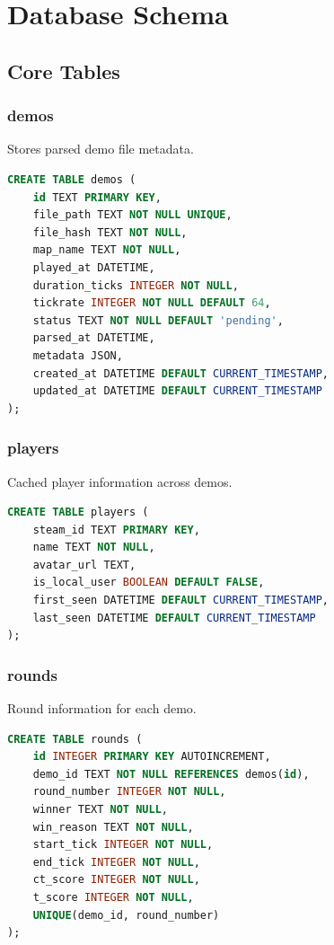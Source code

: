 \chapter{Database Schema}
\label{app:schema}

\section{Core Tables}

\subsection{demos}

Stores parsed demo file metadata.

\begin{lstlisting}[language=SQL]
CREATE TABLE demos (
    id TEXT PRIMARY KEY,
    file_path TEXT NOT NULL UNIQUE,
    file_hash TEXT NOT NULL,
    map_name TEXT NOT NULL,
    played_at DATETIME,
    duration_ticks INTEGER NOT NULL,
    tickrate INTEGER NOT NULL DEFAULT 64,
    status TEXT NOT NULL DEFAULT 'pending',
    parsed_at DATETIME,
    metadata JSON,
    created_at DATETIME DEFAULT CURRENT_TIMESTAMP,
    updated_at DATETIME DEFAULT CURRENT_TIMESTAMP
);
\end{lstlisting}

\subsection{players}

Cached player information across demos.

\begin{lstlisting}[language=SQL]
CREATE TABLE players (
    steam_id TEXT PRIMARY KEY,
    name TEXT NOT NULL,
    avatar_url TEXT,
    is_local_user BOOLEAN DEFAULT FALSE,
    first_seen DATETIME DEFAULT CURRENT_TIMESTAMP,
    last_seen DATETIME DEFAULT CURRENT_TIMESTAMP
);
\end{lstlisting}

\subsection{rounds}

Round information for each demo.

\begin{lstlisting}[language=SQL]
CREATE TABLE rounds (
    id INTEGER PRIMARY KEY AUTOINCREMENT,
    demo_id TEXT NOT NULL REFERENCES demos(id),
    round_number INTEGER NOT NULL,
    winner TEXT NOT NULL,
    win_reason TEXT NOT NULL,
    start_tick INTEGER NOT NULL,
    end_tick INTEGER NOT NULL,
    ct_score INTEGER NOT NULL,
    t_score INTEGER NOT NULL,
    UNIQUE(demo_id, round_number)
);
\end{lstlisting}

